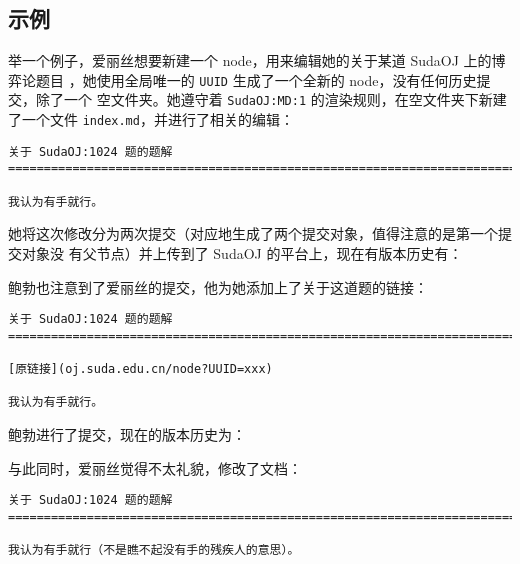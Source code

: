 \subsection{示例}
举一个例子，爱丽丝想要新建一个 node，用来编辑她的关于某道 SudaOJ 上的博弈论题目
，她使用全局唯一的 \verb|UUID| 生成了一个全新的 node，没有任何历史提交，除了一个
空文件夹。她遵守着 \verb|SudaOJ:MD:1| 的渲染规则，在空文件夹下新建了一个文件 %
\verb|index.md|，并进行了相关的编辑：

\begin{lstlisting}
关于 SudaOJ:1024 题的题解
===============================================================================

我认为有手就行。
\end{lstlisting}

她将这次修改分为两次提交（对应地生成了两个提交对象，值得注意的是第一个提交对象没
有父节点）并上传到了 SudaOJ 的平台上，现在有版本历史有：
\begin{center}
\end{center}

鲍勃也注意到了爱丽丝的提交，他为她添加上了关于这道题的链接：

\begin{lstlisting}
关于 SudaOJ:1024 题的题解
===============================================================================

[原链接](oj.suda.edu.cn/node?UUID=xxx)

我认为有手就行。
\end{lstlisting}

鲍勃进行了提交，现在的版本历史为：
\begin{center}
\end{center}

与此同时，爱丽丝觉得不太礼貌，修改了文档：

\begin{lstlisting}
关于 SudaOJ:1024 题的题解
===============================================================================

我认为有手就行（不是瞧不起没有手的残疾人的意思）。
\end{lstlisting}

